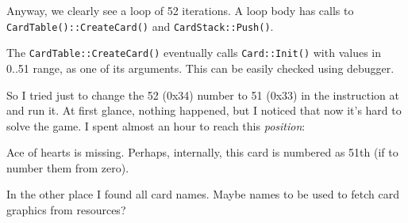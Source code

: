 Anyway, we clearly see a loop of 52 iterations.
A loop body has calls to \verb|CardTable()::CreateCard()| and \verb|CardStack::Push()|.

The \verb|CardTable::CreateCard()| eventually calls \verb|Card::Init()| with values in 0..51 range, as one of its arguments.
This can be easily checked using debugger.

So I tried just to change the 52 (0x34) number to 51 (0x33) in the  instruction at  and run it.
At first glance, nothing happened, but I noticed that now it's hard to solve the game.
I spent almost an hour to reach this \textit{position}:

\begin{figure}[H]
\centering
{}
\end{figure}

Ace of hearts is missing. Perhaps, internally, this card is numbered as 51th (if to number them from zero).

In the other place I found all card names. Maybe names to be used to fetch card graphics from resources?

